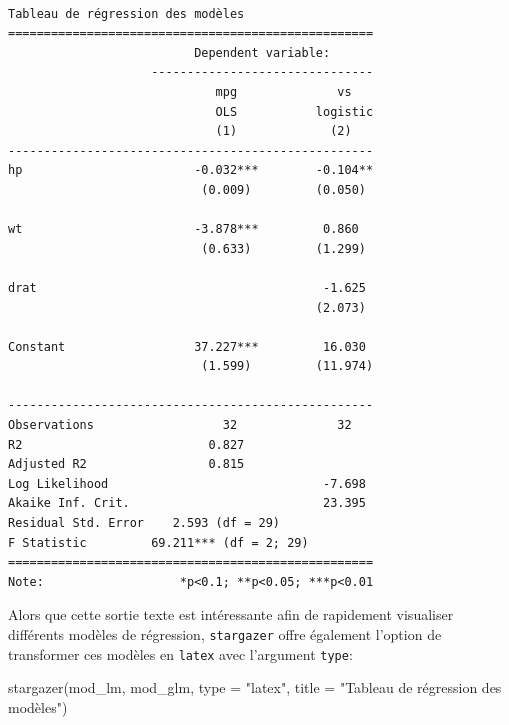 \documentclass[
  letterpaper,
  DIV=11,
  numbers=noendperiod]{scrreprt}
\newenvironment{Shaded}{\begin{snugshade}}{\end{snugshade}}
\newcommand{\AttributeTok}[1]{\textcolor[rgb]{0.40,0.45,0.13}{#1}}
\newcommand{\FunctionTok}[1]{\textcolor[rgb]{0.28,0.35,0.67}{#1}}
\newcommand{\NormalTok}[1]{\textcolor[rgb]{0.00,0.23,0.31}{#1}}
\newcommand{\StringTok}[1]{\textcolor[rgb]{0.13,0.47,0.30}{#1}}
\begin{document}
\begin{verbatim}

Tableau de régression des modèles
===================================================
                          Dependent variable:      
                    -------------------------------
                             mpg              vs   
                             OLS           logistic
                             (1)             (2)   
---------------------------------------------------
hp                        -0.032***        -0.104**
                           (0.009)         (0.050) 
                                                   
wt                        -3.878***         0.860  
                           (0.633)         (1.299) 
                                                   
drat                                        -1.625 
                                           (2.073) 
                                                   
Constant                  37.227***         16.030 
                           (1.599)         (11.974)
                                                   
---------------------------------------------------
Observations                  32              32   
R2                          0.827                  
Adjusted R2                 0.815                  
Log Likelihood                              -7.698 
Akaike Inf. Crit.                           23.395 
Residual Std. Error    2.593 (df = 29)             
F Statistic         69.211*** (df = 2; 29)         
===================================================
Note:                   *p<0.1; **p<0.05; ***p<0.01
\end{verbatim}

Alors que cette sortie texte est intéressante afin de rapidement
visualiser différents modèles de régression, \texttt{stargazer} offre
également l'option de transformer ces modèles en \texttt{latex} avec
l'argument \texttt{type}:

\begin{Shaded}
\begin{Highlighting}[]
\FunctionTok{stargazer}\NormalTok{(mod\_lm, mod\_glm, }\AttributeTok{type =} \StringTok{"latex"}\NormalTok{, }\AttributeTok{title =} \StringTok{"Tableau de régression des modèles"}\NormalTok{)}
\end{Highlighting}
\end{Shaded}
\end{document}
